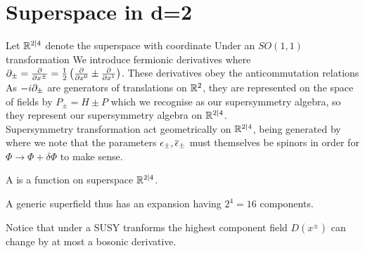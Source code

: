 \documentclass{article}
\begin{document}
\section{Superspace in d=2}
Let $\mathbb{R}^{2|4}$ denote the superspace with coordinate 
Under an $SO(1,1)$ transformation 
We introduce fermionic derivatives
where $\partial_\pm = \frac{\partial}{\partial x^\pm} = \frac{1}{2}\left( \frac{\partial}{\partial x^0} \pm \frac{\partial}{\partial x^1} \right)$. These derivatives obey the anticommutation relations 
As $-i\partial_\pm$ are generators of translations on $\mathbb{R}^2$, they are represented on the space of fields by $P_{\pm} = H \pm P$ which we recognise as our supersymmetry algebra, so they represent our supersymmetry algebra on $\mathbb{R}^{2|4}$. \\
Supersymmetry transformation act geometrically on $\mathbb{R}^{2|4}$, being generated by 
where we note that the parameters $\epsilon_\pm, \overline{\epsilon}_\pm$ must themselves be spinors in order for $\Phi \to \Phi + \delta \Phi$ to make sense. 
\begin{definition}
	A  is a function on superspace $\mathbb{R}^{2|4}$.
\end{definition}
\begin{lemma}
 A generic superfield thus has an expansion 
having $2^4 = 16$ components.
\end{lemma}
Notice that under a SUSY tranforms 
the highest component field $D(x^\pm)$ can change by at most a bosonic derivative. 
\end{document}
